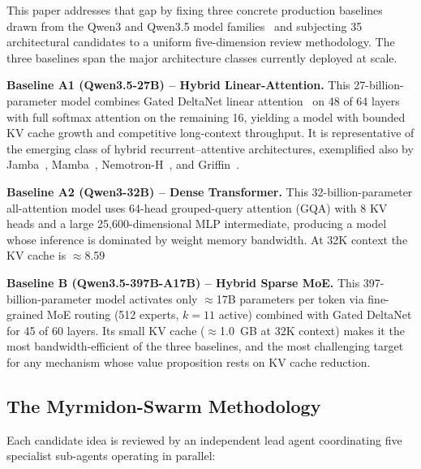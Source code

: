\documentclass[11pt]{article}
\begin{document}
This paper addresses that gap by fixing three concrete production baselines drawn from the Qwen3 and Qwen3.5 model families~\cite{Qwen2025,Qwen35_2025} and subjecting 35 architectural candidates to a uniform five-dimension review methodology.
The three baselines span the major architecture classes currently deployed at scale.

\textbf{Baseline A1 (Qwen3.5-27B) -- Hybrid Linear-Attention.}
This 27-billion-parameter model combines Gated DeltaNet linear attention~\cite{Yang2024DeltaNet} on 48 of 64 layers with full softmax attention on the remaining 16, yielding a model with bounded KV cache growth and competitive long-context throughput.
It is representative of the emerging class of hybrid recurrent--attentive architectures, exemplified also by Jamba~\cite{Lieber2024Jamba}, Mamba~\cite{Gu2023Mamba}, Nemotron-H~\cite{NVIDIAADLR2025}, and Griffin~\cite{De2024Griffin}.

\textbf{Baseline A2 (Qwen3-32B) -- Dense Transformer.}
This 32-billion-parameter all-attention model uses 64-head grouped-query attention (GQA) with 8 KV heads and a large 25,600-dimensional MLP intermediate, producing a model whose inference is dominated by weight memory bandwidth.
At 32K context the KV cache is $\approx$8.59~

\textbf{Baseline B (Qwen3.5-397B-A17B) -- Hybrid Sparse MoE.}
This 397-billion-parameter model activates only $\approx$17B parameters per token via fine-grained MoE routing (512 experts, $k{=}11$ active) combined with Gated DeltaNet for 45 of 60 layers.
Its small KV cache ($\approx$1.0~GB at 32K context) makes it the most bandwidth-efficient of the three baselines, and the most challenging target for any mechanism whose value proposition rests on KV cache reduction.

\subsection*{The Myrmidon-Swarm Methodology}

Each candidate idea is reviewed by an independent lead agent coordinating five specialist sub-agents operating in parallel:
\end{document}
